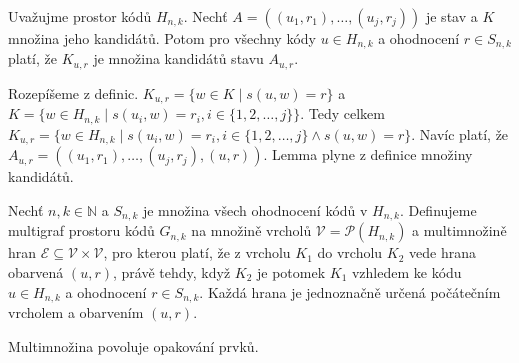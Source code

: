 
\begin{lemma}\label{lemmavztahnaslednikuapotomku}
    Uvažujme prostor kódů $H_{n,k}$. Nechť $A = \left((u_1, r_1), \dots, (u_j,r_j)\right)$ je stav a $K$ množina jeho kandidátů. Potom pro všechny kódy $u\in H_{n,k}$ a ohodnocení $r \in S_{n,k}$ platí, že $K_{u,r}$ je množina kandidátů stavu $A_{u,r}$.
\end{lemma}
\begin{dukaz}
    Rozepíšeme z definic. 
    $K_{u,r} = \{w \in K \mid s(u,w) = r\}$ a $K = \{w \in H_{n,k} \mid s(u_i,w) = r_i,  i \in \{1,2,\dots ,j\} \}$. Tedy celkem 
    $K_{u,r} = \{w \in H_{n,k} \mid s(u_i,w) = r_i,  i \in \{1,2,\dots ,j\} \land s(u,w) = r\}$.
    Navíc platí, že $A_{u,r} = \left((u_1, r_1), \dots, (u_j,r_j), (u,r)\right)$. Lemma plyne z definice množiny kandidátů.
\end{dukaz}


\begin{definice}
  Nechť $n, k\in \mathbb{N}$ a $S_{n,k}$ je množina všech ohodnocení kódů v $H_{n,k}$. Definujeme multigraf prostoru kódů $G_{n,k}$ na množině vrcholů $\mathcal{V} = \mathcal{P}(H_{n,k})$ a multimnožině hran $\mathcal{E} \subseteq \mathcal{V} \times \mathcal{V}$, pro kterou platí, že z vrcholu $K_1$ do vrcholu $K_2$ vede hrana obarvená $(u,r)$, právě tehdy, když $K_2$ je potomek $K_1$ vzhledem ke kódu $u \in H_{n,k}$ a ohodnocení $r \in S_{n,k}$. Každá hrana je jednoznačně určená počátečním vrcholem a obarvením $(u,r)$. 
  
  
\end{definice}
\begin{pozn}
    Multimnožina povoluje opakování prvků. 
\end{pozn}

